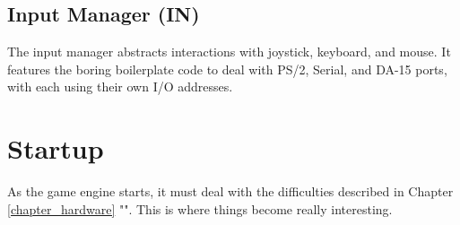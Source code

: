 \documentclass[book.tex]{subfiles}
\begin{document}
\subsection{Input Manager (IN)}
The input manager abstracts interactions with joystick, keyboard, and mouse. It features the boring boilerplate code to deal with PS/2, Serial, and DA-15 ports, with each using their own I/O addresses.
















\section{Startup}
As the game engine starts, it must deal with the difficulties described in Chapter \ref{chapter_hardware} "". This is where things become really interesting.
\end{document}
